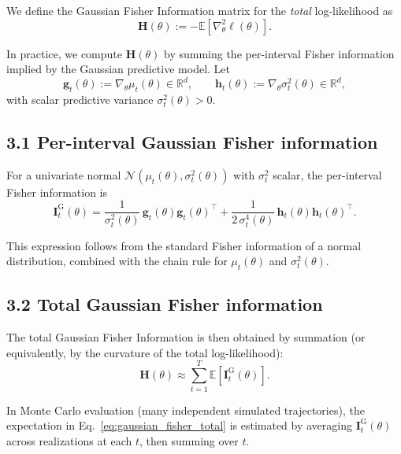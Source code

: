 \documentclass[11pt]{article}
\begin{document}
We define the Gaussian Fisher Information matrix for the \emph{total} log-likelihood as
\begin{equation}
\mathbf H(\theta)
:=
- \mathbb{E}\left[ \nabla_\theta^2 \ell(\theta) \right].
\end{equation}

In practice, we compute $\mathbf H(\theta)$ by summing the per-interval Fisher information
implied by the Gaussian predictive model. Let
\begin{equation}
\mathbf g_t(\theta) := \nabla_\theta \mu_t(\theta) \in \mathbb{R}^d,
\qquad
\mathbf h_t(\theta) := \nabla_\theta \sigma_t^2(\theta) \in \mathbb{R}^d,
\end{equation}
with scalar predictive variance $\sigma_t^2(\theta) > 0$.

\subsection*{3.1 Per-interval Gaussian Fisher information}

For a univariate normal $\mathcal{N}(\mu_t(\theta),\sigma_t^2(\theta))$ with $\sigma_t^2$ scalar,
the per-interval Fisher information is
\begin{equation}
\mathbf I_t^{\mathrm{G}}(\theta)
=
\frac{1}{\sigma_t^2(\theta)}\,\mathbf g_t(\theta)\mathbf g_t(\theta)^\top
+
\frac{1}{2\,\sigma_t^4(\theta)}\,\mathbf h_t(\theta)\mathbf h_t(\theta)^\top.
\label{eq:gaussian_fisher_interval}
\end{equation}

This expression follows from the standard Fisher information of a normal distribution,
combined with the chain rule for $\mu_t(\theta)$ and $\sigma_t^2(\theta)$.

\subsection*{3.2 Total Gaussian Fisher information}

The total Gaussian Fisher Information is then obtained by summation (or equivalently, by the curvature of the total log-likelihood):
\begin{equation}
\mathbf H(\theta)
\approx
\sum_{t=1}^T \mathbb{E}\!\left[\mathbf I_t^{\mathrm{G}}(\theta)\right].
\label{eq:gaussian_fisher_total}
\end{equation}

In Monte Carlo evaluation (many independent simulated trajectories), the expectation in
Eq.~\eqref{eq:gaussian_fisher_total} is estimated by averaging $\mathbf I_t^{\mathrm{G}}(\theta)$ across realizations
at each $t$, then summing over $t$.
\end{document}
